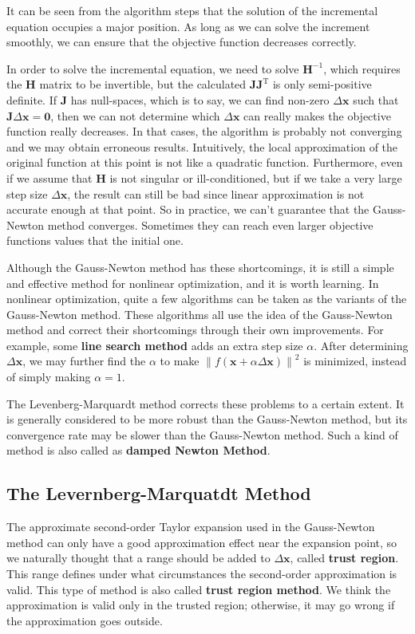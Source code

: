 It can be seen from the algorithm steps that the solution of the incremental equation occupies a major position. As long as we can solve the increment smoothly, we can ensure that the objective function decreases correctly.

In order to solve the incremental equation, we need to solve $\mathbf{H}^{-1}$, which requires the $\mathbf{H}$ matrix to be invertible, but the calculated $\mathbf{J} \mathbf{ J}^\mathrm{T}$ is only semi-positive definite. If $\mathbf{J}$ has null-spaces, which is to say, we can find non-zero $\Delta \mathbf{x}$ such that $\mathbf{J} \Delta\mathbf{x} = \mathbf{0}$, then we can not determine which $\Delta \mathbf{x}$ can really makes the objective function really decreases. In that cases, the algorithm is probably not converging and we may obtain erroneous results. Intuitively, the local approximation of the original function at this point is not like a quadratic function. Furthermore, even if we assume that $\mathbf{H}$ is not singular or ill-conditioned, but if we take a very large step size $\Delta \mathbf{x}$, the result can still be bad since linear approximation is not accurate enough at that point. So in practice, we can't guarantee that the Gauss-Newton method converges. Sometimes they can reach even larger objective functions values that the initial one. 

Although the Gauss-Newton method has these shortcomings, it is still a simple and effective method for nonlinear optimization, and it is worth learning. In nonlinear optimization, quite a few algorithms can be taken as the variants of the Gauss-Newton method. These algorithms all use the idea of the Gauss-Newton method and correct their shortcomings through their own improvements. For example, some \textbf{line search method} adds an extra step size $\alpha$. After determining $\Delta \mathbf{x}$, we may further find the $\alpha$ to make $\left\| f (\mathbf{x} + \alpha \Delta \mathbf{ x}) \right\|^2$ is minimized, instead of simply making $\alpha = 1$.

The Levenberg-Marquardt method corrects these problems to a certain extent. It is generally considered to be more robust than the Gauss-Newton method, but its convergence rate may be slower than the Gauss-Newton method. Such a kind of method is also called as \textbf{damped Newton Method}.

\subsection{The Levernberg-Marquatdt Method}
The approximate second-order Taylor expansion used in the Gauss-Newton method can only have a good approximation effect near the expansion point, so we naturally thought that a range should be added to $\Delta \mathbf{x}$, called \textbf{trust region}. This range defines under what circumstances the second-order approximation is valid. This type of method is also called \textbf{trust region method}. We think the approximation is valid only in the trusted region; otherwise, it may go wrong if the approximation goes outside.

